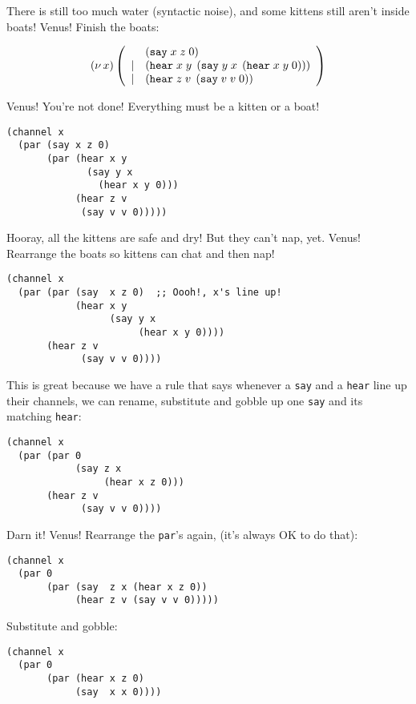 \documentclass[10pt,oneside,x11names]{article}
\newcommand\napping    [0]{0}
\newcommand\whispering [2]{(\nu\,#1)\,{#2}}
\theoremstyle{definition}
\theoremstyle{warning}
\newcommand\say [3]{\left(\texttt{say}\thickspace{}#1\thickspace{}#2\thickspace{}#3\right)}
\newcommand\hear[3]{\left(\texttt{hear}\thickspace{}#1\thickspace{}#2\thickspace{}#3\right)}
\newcommand\kitA{\say{x}{z}{\napping}}
\newcommand\kitB{\hear{x}{y}{\say{y}{x}{\hear{x}{y}{\napping}}}}
\newcommand\kitC{\hear{z}{v}{\say{v}{v}{\napping}}}
\begin{document}
There is still too much water (syntactic noise), and some kittens
still aren't inside boats! Venus! Finish the boats:

\begin{equation}
\whispering{x}{\left(
\begin{array}{clll}
 {}     & \kitA \\
 \vert  & \kitB \\
 \vert  & \kitC \\
\end{array}\right)}
\end{equation}

Venus! You're not done! Everything must be a kitten or a boat!

\vskip 0.26cm
\begin{verbatim}
(channel x
  (par (say x z 0)
       (par (hear x y
              (say y x
                (hear x y 0)))
            (hear z v
             (say v v 0)))))
\end{verbatim}

Hooray, all the kittens are safe and dry! But they can't nap, yet.
Venus! Rearrange the boats so kittens can chat and then nap!

\vskip 0.26cm
\begin{verbatim}
(channel x
  (par (par (say  x z 0)  ;; Oooh!, x's line up!
            (hear x y
                  (say y x
                       (hear x y 0))))
       (hear z v
             (say v v 0))))
\end{verbatim}

This is great because we have a rule that says whenever a \texttt{say}
and a \texttt{hear} line up their channels, we can rename, substitute and
gobble up one \texttt{say} and its matching \texttt{hear}:

\vskip 0.26cm
\begin{verbatim}
(channel x
  (par (par 0
            (say z x
                 (hear x z 0)))
       (hear z v
             (say v v 0))))
\end{verbatim}

Darn it! Venus! Rearrange the \texttt{par}'s again, (it's always OK to do
that):

\vskip 0.26cm
\begin{verbatim}
(channel x
  (par 0
       (par (say  z x (hear x z 0))
            (hear z v (say v v 0)))))
\end{verbatim}

Substitute and gobble:

\vskip 0.26cm
\begin{verbatim}
(channel x
  (par 0
       (par (hear x z 0)
            (say  x x 0))))
\end{verbatim}
\end{document}
